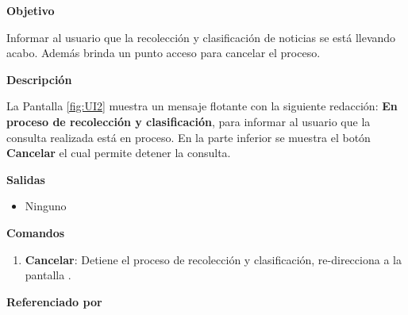\begin{large}
  \textbf{Objetivo}\\
\end{large}


Informar al usuario que la recolección y clasificación de noticias se está llevando acabo. Además brinda un punto acceso para cancelar el proceso.\\

\begin{large}
  \textbf{Descripción}\\
\end{large}

La Pantalla \ref{fig:UI2} muestra un mensaje flotante con la siguiente redacción: \textbf{En proceso de recolección y clasificación}, para informar al usuario que la consulta realizada está en proceso. En la parte inferior se muestra el botón \textbf{Cancelar} el cual permite detener la consulta.\\

\begin{large}
  \textbf{Salidas}
\end{large}

\begin{itemize}

  \item Ninguno

\end{itemize}


\textbf{Comandos}

\begin{enumerate}

  \item \textbf{Cancelar}: Detiene el proceso de recolección y clasificación, re-direcciona a la pantalla .

\end{enumerate}

\begin{large}
  \textbf{Referenciado por}
\end{large}

